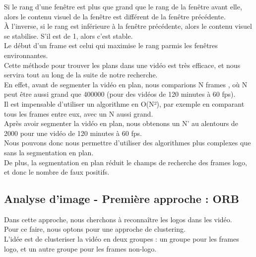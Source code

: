 \documentclass[11pt]{article}
\begin{document}
Si le rang d'une fenêtre est plus que grand que le rang de la fenêtre avant elle, alors le contenu visuel de la fenêtre est différent de la fenêtre précédente.\\
À l'inverse, si le rang est inférieure à la fenêtre précédente, alors le contenu visuel se stabilise. S'il est de 1, alors c'est stable.\\

Le début d'un frame est celui qui maximise le rang parmis les fenêtres environnantes.\\

Cette méthode pour trouver les plans dans une vidéo est très efficace, et nous servira tout au long de la suite de notre recherche.\\

En effet, avant de segmenter la vidéo en plan, nous comparions  N frames , où N peut être aussi grand que 400000 (pour des vidéos de 120 minutes à 60 fps).\\
Il est impensable d’utiliser un algorithme en O(N²), par exemple en comparant tous les frames entre eux, avec un N aussi grand.\\

Après avoir segmenter la vidéo en plan, nous obtenons un N’ au alentours de 2000 pour une vidéo de 120 minutes à 60 fps.\\
Nous pouvons donc nous permettre d’utiliser des algorithmes plus complexes que sans la segmentation en plan.\\
De plus, la segmentation en plan réduit le champs de recherche des frames logo, et donc le nombre de faux positifs.\\

\subsection{Analyse d'image - Première approche : ORB}
\label{sec:org01aa98d}
Dans cette approche, nous cherchons à reconnaître les logos dans les vidéo.\\
Pour ce faire, nous optons pour une approche de clustering.\\
L'idée est de clusteriser la vidéo en deux groupes : un groupe pour les frames logo, et un autre groupe pour les frames non-logo.\\
\end{document}
